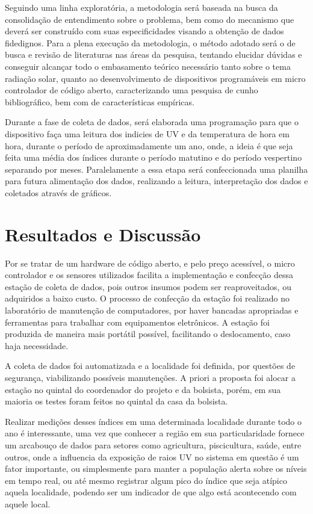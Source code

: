 \documentclass[article,12pt,onesidea,4paper,english,brazil]{abntex2}
\begin{document}
	Seguindo uma linha exploratória, a metodologia será baseada na busca da consolidação de entendimento sobre o problema, bem como do mecanismo que deverá ser construído com suas especificidades visando a obtenção de dados fidedignos. Para a plena execução da metodologia, o método adotado será o de busca e revisão de literaturas nas áreas da pesquisa, tentando elucidar dúvidas e conseguir alcançar todo o embasamento teórico necessário tanto sobre o tema radiação solar, quanto ao desenvolvimento de dispositivos programáveis em micro controlador de código aberto, caracterizando uma pesquisa de cunho bibliográfico, bem com de características empíricas.
	
	Durante a fase de coleta de dados, será elaborada uma programação para que o dispositivo faça uma leitura dos indicies de UV e da temperatura de hora em hora, durante o período de aproximadamente um ano, onde, a ideia é que seja feita uma média dos índices durante o período matutino e do período vespertino separando por meses. Paralelamente a essa etapa será confeccionada uma planilha para futura alimentação dos dados, realizando a leitura, interpretação dos dados e coletados através de gráficos.
	
	\section*{Resultados e Discussão}
	
	Por se tratar de um hardware de código aberto, e pelo preço acessível, o micro controlador e os sensores utilizados facilita a implementação e confecção dessa estação de coleta de dados, pois outros insumos podem ser reaproveitados, ou adquiridos a baixo custo. O processo de confecção da estação foi realizado no laboratório de manutenção de computadores, por haver bancadas apropriadas e ferramentas para trabalhar com equipamentos eletrônicos. A estação foi produzida de maneira mais portátil possível, facilitando o deslocamento, caso haja necessidade.
	
	A coleta de dados foi automatizada e a localidade foi definida, por questões de segurança, viabilizando possíveis manutenções. A priori a proposta foi alocar a estação no quintal do coordenador do projeto e da bolsista, porém, em sua maioria os testes foram feitos no quintal da casa da bolsista.
	
	Realizar medições desses índices em uma determinada localidade durante todo o ano é interessante, uma vez que conhecer a região em sua particularidade fornece um arcabouço de dados para setores como agricultura, piscicultura, saúde, entre outros, onde a influencia da exposição de raios UV no sistema em questão é um fator importante, ou simplesmente para manter a população alerta sobre os níveis em tempo real, ou até mesmo registrar algum pico do índice que seja atípico aquela localidade, podendo ser um indicador de que algo está acontecendo com aquele local.
	
\end{document}
